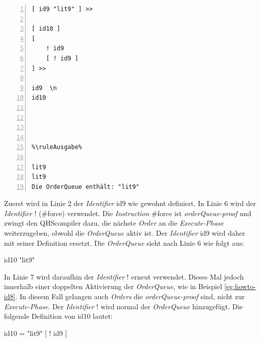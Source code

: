 \begin{minipage}{\linewidth}
\begin{multicols}{2}
\begin{lstlisting}[language=QHS, label=eg:howto-id9, caption=Beispiel zu {\selectListingFont \#force} , numbers=left, stepnumber=1]
%\ruleEingabe%
[ id9 "lit9" ] >>

[ id10 ]
[
    ! id9
    [ ! id9 ]
] >>

id9  \n
id10




%\ruleAusgabe%

lit9
lit9
Die OrderQueue enthält: "lit9"
\end{lstlisting}
\columnbreak
Zuerst wird in Linie 2 der \textit{Identifier} {\selectListingFont id9} wie gewohnt definiert. In Linie 6 wird der \textit{Identifier} {\selectListingFont !} ({\selectListingFont \#force}) verwendet.
Die \textit{Instruction} {\selectListingFont \#force} ist \textit{orderQueue-proof} und zwingt den QHScompiler dazu, die nächste \textit{Order} an die \textit{Execute-Phase} weiterzugeben, obwohl die \textit{OrderQueue} aktiv ist.
Der \textit{Identifier} {\selectListingFont id9} wird daher mit seiner Definition ersetzt. Die \textit{OrderQueue} sieht nach Linie 6 wie folgt aus: \break
\centerline{\selectListingFont id10 "lit9"{}}
In Linie 7 wird daraufhin der \textit{Identifier} {\selectListingFont !} erneut verwendet. Dieses Mal jedoch innerhalb einer doppelten Aktivierung der \textit{OrderQueue}, wie in Beispiel \ref{eg:howto-id8}.
In diesem Fall gelangen auch \textit{Orders} die \textit{orderQueue-proof} sind, nicht zur \textit{Execute-Phase}. Der \textit{Identifier} {\selectListingFont !} wird normal der \textit{OrderQueue} hinzugefügt.
Die folgende Definition von {\selectListingFont id10} lautet: \break
\centerline{\selectListingFont id10 = "lit9"{} [ ! id9 ]}
\end{multicols}
\end{minipage}
\vspace{\baselineskip}


